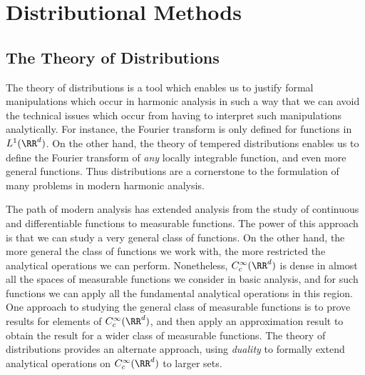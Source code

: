 
\part{Distributional Methods}

\chapter{The Theory of Distributions}

The theory of distributions is a tool which enables us to justify formal manipulations which occur in harmonic analysis in such a way that we can avoid the technical issues which occur from having to interpret such manipulations analytically. For instance, the Fourier transform is only defined for functions in $L^1(\RR^d)$. On the other hand, the theory of tempered distributions enables us to define the Fourier transform of \emph{any} locally integrable function, and even more general functions. Thus distributions are a cornerstone to the formulation of many problems in modern harmonic analysis.

The path of modern analysis has extended analysis from the study of continuous and differentiable functions to measurable functions. The power of this approach is that we can study a very general class of functions. On the other hand, the more general the class of functions we work with, the more restricted the analytical operations we can perform. Nonetheless, $C^\infty_c(\RR^d)$ is dense in almost all the spaces of measurable functions we consider in basic analysis, and for such functions we can apply all the fundamental analytical operations in this region. One approach to studying the general class of measurable functions is to prove results for elements of $C_c^\infty(\RR^d)$, and then apply an approximation result to obtain the result for a wider class of measurable functions. The theory of distributions provides an alternate approach, using \emph{duality} to formally extend analytical operations on $C^\infty_c(\RR^d)$ to larger sets.

